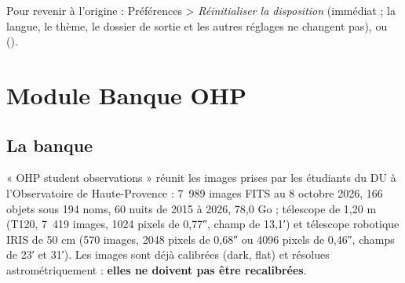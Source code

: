 Pour revenir à l'origine : Préférences > \emph{Réinitialiser la disposition} (immédiat ; la langue, le thème, le
dossier de sortie et les autres réglages ne changent pas), ou 
().

\section{Module Banque OHP}
\subsection{La banque}
« OHP student observations » réunit les images prises par les étudiants du DU à l'Observatoire de Haute-Provence :
7~989 images FITS au 8 octobre 2026, 166 objets sous 194 noms, 60 nuits de 2015 à 2026, 78,0 Go ; télescope de
1,20 m (T120, 7~419 images, 1024 pixels de 0,77″, champ de 13,1′) et télescope robotique IRIS de 50 cm (570 images,
2048 pixels de 0,68″ ou 4096 pixels de 0,46″, champs de 23′ et 31′). Les images sont déjà calibrées (dark, flat) et
résolues astrométriquement : \textbf{elles ne doivent pas être recalibrées}.

